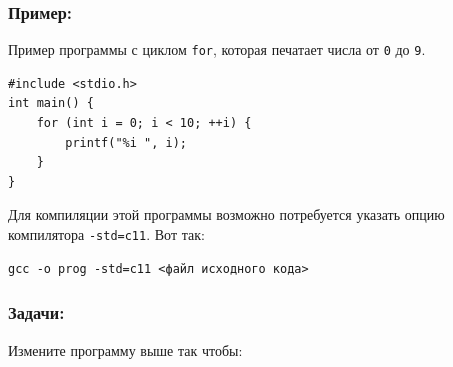 \documentclass{article}
\begin{document}
\subsubsection*{Пример:}
Пример программы с циклом \texttt{for}, которая печатает числа от \texttt{0} до \texttt{9}.
\begin{lstlisting}
#include <stdio.h>
int main() {
    for (int i = 0; i < 10; ++i) {
        printf("%i ", i);
    }
}
\end{lstlisting}
Для компиляции этой программы возможно потребуется указать опцию компилятора \texttt{-std=c11}. Вот так:
\begin{verbatim}
gcc -o prog -std=c11 <файл исходного кода>
\end{verbatim}

\subsubsection*{Задачи:}
Измените программу выше так чтобы:
\end{document}
